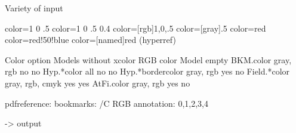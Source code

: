 Variety of input

color=1 0 .5
color=1 0 .5 0.4
color=[rgb]{1,0,.5}
color=[gray]{.5}
color=red
color=red!50!blue
color=[named]{red} (hyperref)


Color option   Models without xcolor RGB color Model empty
BKM.color      gray, rgb             no        no
Hyp.*color     all                   no        no
Hyp.*bordercolor gray, rgb           yes       no
Field.*color   gray, rgb, cmyk       yes       yes
AtFi.color     gray, rgb             yes       no


pdfreference:
bookmarks: /C RGB
annotation: 0,1,2,3,4


-> output 

